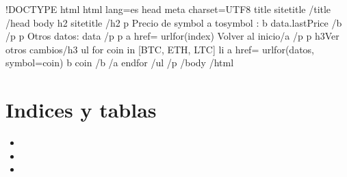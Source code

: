 \documentclass[a5paper,9pt,spanish]{sphinxmanual}
\begin{document}
\begin{sphinxVerbatim}[commandchars=\\\{\}]
\PYGZlt{}!DOCTYPE html\PYGZgt{}
\PYGZlt{}html lang=\PYGZdq{}es\PYGZdq{}\PYGZgt{}
\PYGZlt{}head\PYGZgt{}
    \PYGZlt{}meta charset=\PYGZdq{}UTF\PYGZhy{}8\PYGZdq{}\PYGZgt{}
    \PYGZlt{}title\PYGZgt{}\PYGZob{}\PYGZob{} site\PYGZus{}title \PYGZcb{}\PYGZcb{}\PYGZlt{}/title\PYGZgt{}
\PYGZlt{}/head\PYGZgt{}
\PYGZlt{}body\PYGZgt{}
    \PYGZlt{}h2\PYGZgt{}\PYGZob{}\PYGZob{} site\PYGZus{}title \PYGZcb{}\PYGZcb{}\PYGZlt{}/h2\PYGZgt{}
    \PYGZlt{}p\PYGZgt{}
      Precio de \PYGZob{}\PYGZob{} symbol \PYGZcb{}\PYGZcb{} a \PYGZob{}\PYGZob{} to\PYGZus{}symbol \PYGZcb{}\PYGZcb{}: \PYGZlt{}b\PYGZgt{}\PYGZob{}\PYGZob{} data.lastPrice \PYGZcb{}\PYGZcb{}\PYGZlt{}/b\PYGZgt{}
    \PYGZlt{}/p\PYGZgt{}
    \PYGZlt{}p\PYGZgt{}
      Otros datos: \PYGZob{}\PYGZob{} data \PYGZcb{}\PYGZcb{}
    \PYGZlt{}/p\PYGZgt{}
    \PYGZlt{}p\PYGZgt{}
      \PYGZlt{}a href=\PYGZdq{}\PYGZob{}\PYGZob{} url\PYGZus{}for(\PYGZsq{}index\PYGZsq{}) \PYGZcb{}\PYGZcb{}\PYGZdq{}\PYGZgt{}Volver al inicio\PYGZlt{}/a\PYGZgt{}
    \PYGZlt{}/p\PYGZgt{}
    \PYGZlt{}p\PYGZgt{}
      \PYGZlt{}h3\PYGZgt{}Ver otros cambios\PYGZlt{}/h3\PYGZgt{}
      \PYGZlt{}ul\PYGZgt{}
        \PYGZob{}\PYGZpc{} for coin in [\PYGZsq{}BTC\PYGZsq{}, \PYGZsq{}ETH\PYGZsq{}, \PYGZsq{}LTC\PYGZsq{}] \PYGZpc{}\PYGZcb{}
        \PYGZlt{}li\PYGZgt{}
          \PYGZlt{}a href=\PYGZdq{}\PYGZob{}\PYGZob{} url\PYGZus{}for(\PYGZsq{}datos\PYGZsq{}, symbol=coin) \PYGZcb{}\PYGZcb{}\PYGZdq{}\PYGZgt{}
            \PYGZlt{}b\PYGZgt{}\PYGZob{}\PYGZob{} coin \PYGZcb{}\PYGZcb{}\PYGZlt{}/b\PYGZgt{}
          \PYGZlt{}/a\PYGZgt{}
        \PYGZob{}\PYGZpc{} endfor \PYGZpc{}\PYGZcb{}
      \PYGZlt{}/ul\PYGZgt{}
    \PYGZlt{}/p\PYGZgt{}
\PYGZlt{}/body\PYGZgt{}
\PYGZlt{}/html\PYGZgt{}
\end{sphinxVerbatim}


\chapter{Indices y tablas}
\label{\detokenize{index:indices-y-tablas}}\begin{itemize}
\item {} 
\sphinxAtStartPar
{}

\item {} 
\sphinxAtStartPar
{}

\item {} 
\sphinxAtStartPar
{}

\end{itemize}



\renewcommand{\indexname}{Índice}
\printindex
\end{document}
